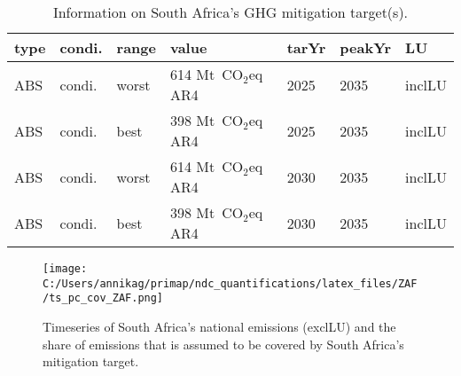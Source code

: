 \documentclass[12pt]{article}
\begin{document}
 \begin{table}[H]
 \centering
 \caption{Information on South Africa's GHG mitigation target(s).}
 \label{tab:mitiTars}
 \begin{tabular}{l l l l l l l }
 \bfseries type & \bfseries condi. & \bfseries range & \bfseries value & \bfseries tarYr & \bfseries peakYr & \bfseries LU \tabularnewline \hline \hline
 ABS & condi. & worst & 614 Mt~CO$_2$eq AR4 & 2025 & 2035 & inclLU \tabularnewline 
 ABS & condi. & best & 398 Mt~CO$_2$eq AR4 & 2025 & 2035 & inclLU \tabularnewline 
 ABS & condi. & worst & 614 Mt~CO$_2$eq AR4 & 2030 & 2035 & inclLU \tabularnewline 
 ABS & condi. & best & 398 Mt~CO$_2$eq AR4 & 2030 & 2035 & inclLU \tabularnewline 
 \end{tabular}
 \end{table}

 \begin{figure}[H]
 \centering
 \texttt{[image: C:/Users/annikag/primap/ndc\_quantifications/latex\_files/ZAF/ts\_pc\_cov\_ZAF.png]}
 \caption{Timeseries of South Africa's national emissions (exclLU) and the share of emissions that is assumed to be covered by South Africa's mitigation target.}
 \label{fig:tsPcCov}
 \end{figure}
\end{document}
